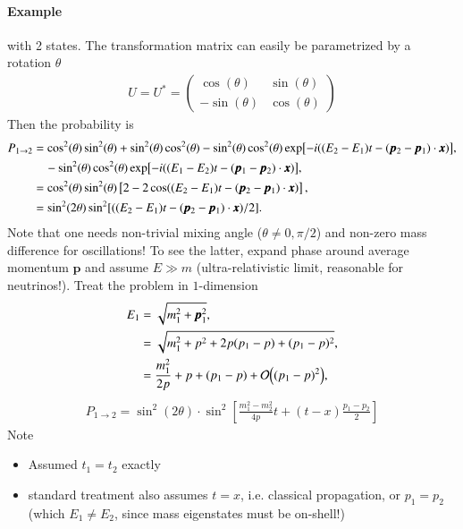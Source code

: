 \paragraph{Example} with 2 states. The transformation matrix can easily be parametrized by a rotation $\theta$
\begin{align}
   U = U^* = \begin{pmatrix} \cos(\theta) & \sin (\theta) \\ -\sin (\theta) & \cos (\theta) \end{pmatrix} \label{1.8}
\end{align}
Then the probability is
\begin{align}
   P_{1\rightarrow 2} &= \cos^2(\theta) \sin^2(\theta) + \sin^2(\theta) \cos^2(\theta) - \sin^2(\theta) \cos^2(\theta)  \exp[-i((E_2 - E_1) t - (\pmb{p}_2 - \pmb{p}_1) \cdot \pmb{x})], \notag \\
                      &\quad - \sin^2(\theta) \cos^2(\theta) \exp[-i((E_1 - E_2) t - (\pmb{p}_1 - \pmb{p}_2) \cdot \pmb{x})], \notag \\
                      &= \cos^2(\theta) \sin^2(\theta) \left[ 2 - 2 \cos((E_2 - E_1)t - (\pmb{p}_2 - \pmb{p}_1)\cdot \pmb{x}) \right], \notag \\
                      &= \sin^2(2\theta) \sin^2[((E_2 - E_1)t - (\pmb{p}_2 - \pmb{p}_1)\cdot \pmb{x})/2]. \label{1.9}
\end{align}
Note  that one needs non-trivial mixing angle ($\theta \neq 0, \pi/2$) and non-zero mass difference for oscillations! To see the latter, expand phase around average momentum $\pmb{p}$ and assume $E \gg m $ (ultra-relativistic limit, reasonable for neutrinos!). Treat the problem in $1$-dimension
\begin{align*}
   E_1 &= \sqrt{m_1^2 + \pmb{p}_1^2}, \\
       &= \sqrt{m_1^2 + p^2 + 2p(p_1 - p) + (p_1 - p)^2}, \\
       &= \frac{m_1^2}{2p} + p  + (p_1 - p) + \order{(p_1-p)^2},
\end{align*} 
\begin{align}
   P_{1\rightarrow 2} = \sin^2(2\theta) \cdot \sin^2 \left[\frac{m_1^2 - m_2^2}{4p}t + (t-x) \frac{p_1-p_2}{2} \right] \label{1.10}
\end{align}
Note
\begin{itemize}
   \item Assumed $t_1 = t_2$ exactly
   \item standard treatment also assumes $t=x$, i.e. classical propagation, or $p_1 = p_2$ (which $E_1 \neq E_2$, since mass eigenstates must be on-shell!)
\end{itemize}

